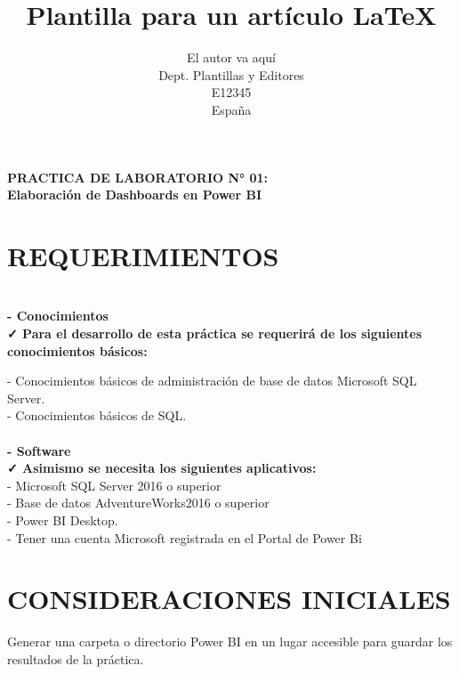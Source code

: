 %
%



\title{Plantilla para un artículo \LaTeX}
\author{El autor va aquí\\
  \small Dept. Plantillas y Editores\\
  \small E12345\\
  \small España
}



\begin{center}
\textbf{PRACTICA DE LABORATORIO N° 01:} \\
\textbf{Elaboración de Dashboards en Power BI} \\
\end{center}

\section{REQUERIMIENTOS}
\textbf{ } \\
\textbf{- Conocimientos} \\
\textbf{✓ Para el desarrollo de esta práctica se requerirá de los siguientes conocimientos básicos:}
\item{- Conocimientos básicos de administración de base de datos Microsoft SQL Server.\\
- Conocimientos básicos de SQL.\\\\
\textbf{- Software} \\
\textbf{✓ Asimismo se necesita los siguientes aplicativos:} \\
- Microsoft SQL Server 2016 o superior\\
- Base de datos AdventureWorks2016 o superior\\
- Power BI Desktop.\\
- Tener una cuenta Microsoft registrada en el Portal de Power Bi}\\

\section{CONSIDERACIONES INICIALES}
\item{Generar una carpeta o directorio Power BI en un lugar accesible para guardar los resultados de la práctica.}
